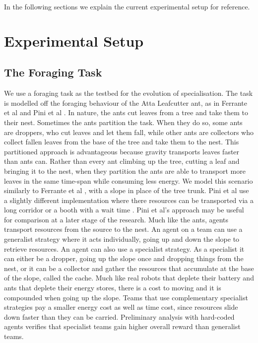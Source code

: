 \documentclass[12pt]{article}
\begin{document}
\begin{appendices}

In the following sections we explain the current experimental setup for reference.

\section{Experimental Setup}

\subsection{The Foraging Task}\label{task_description}

We use a foraging task as the testbed for the evolution of specialisation.
The task is modelled off the foraging behaviour of the Atta Leafcutter ant, as in Ferrante et al \cite{ferrante:PLOS_CB:2015} and Pini et al \cite{pini:ICSI:2012, pini:Swarm_Intelligence:2011}.
In nature, the ants cut leaves from a tree and take them to their nest. 
Sometimes the ants partition the task. 
When they do so, some ants are droppers, who cut leaves and let them fall, while other ants are collectors who collect fallen leaves from the base of the tree and take them to the nest.
This partitioned approach is advantageous because gravity transports leaves faster than ants can.
Rather than every ant climbing up the tree, cutting a leaf and bringing it to the nest, when they partition the ants are able to transport more leaves in the same time-span while consuming less energy.
We model this scenario similarly to Ferrante et al \cite{ferrante:PLOS_CB:2015}, with a slope in place of the tree trunk. 
Pini et al use a slightly different implementation where there resources can be transported via a long corridor or a booth with a wait time \cite{pini:ICSI:2012, pini:Swarm_Intelligence:2011}. 
Pini et al's approach may be useful for comparison at a later stage of the research.
Much like the ants, agents transport resources from the source to the nest.
An agent on a team can use a generalist strategy where it acts individually, going up and down the slope to retrieve resources.
An agent can also use a specialist strategy. 
As a specialist it can either be a dropper, going up the slope once and dropping things from the nest, or it can be a collector and gather the resources that accumulate at the base of the slope, called the cache.
Much like real robots that deplete their battery and ants that deplete their energy stores, there is a cost to moving and it is compounded when going up the slope. 
Teams that use complementary specialist strategies pay a smaller energy cost as well as time cost, since resources slide down faster than they can be carried. 
Preliminary analysis with hard-coded agents verifies that specialist teams gain higher overall reward than generalist teams.\\


\end{appendices}
\end{document}
